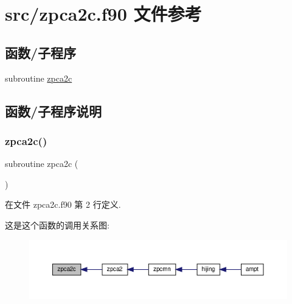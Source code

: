 \hypertarget{zpca2c_8f90}{}\section{src/zpca2c.f90 文件参考}
\label{zpca2c_8f90}
\subsection*{函数/子程序}
\begin{DoxyCompactItemize}
\item 
subroutine \mbox{\hyperlink{zpca2c_8f90_a49c4fa6a9e8cc4597f281643dc6cc744}{zpca2c}}
\end{DoxyCompactItemize}


\subsection{函数/子程序说明}
\mbox{\label{zpca2c_8f90_a49c4fa6a9e8cc4597f281643dc6cc744}} 
\subsubsection{\texorpdfstring{zpca2c()}{zpca2c()}}
{\footnotesize\ttfamily subroutine zpca2c (\begin{DoxyParamCaption}{ }\end{DoxyParamCaption})}



在文件 zpca2c.\+f90 第 2 行定义.

这是这个函数的调用关系图\+:
\nopagebreak
\begin{figure}[H]
\begin{center}
\leavevmode
\includegraphics[width=350pt]{zpca2c_8f90_a49c4fa6a9e8cc4597f281643dc6cc744_icgraph}
\end{center}
\end{figure}
